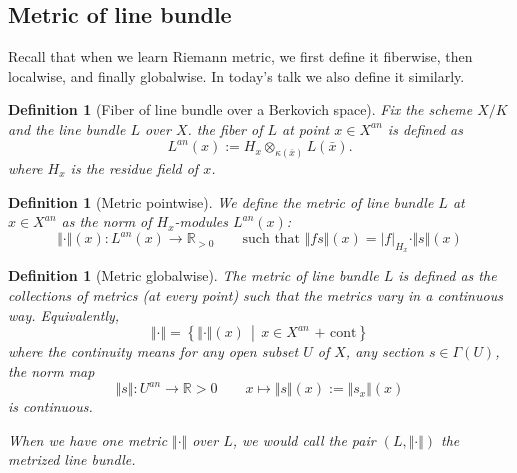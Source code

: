 \documentclass[reqno,11pt]{amsart}
\numberwithin{equation}{section}
\theoremstyle{plain}
\newtheorem{defn}[theorem]{Definition}
\theoremstyle{plain}
\numberwithin{equation}{section}
\theoremstyle{remark}
\newcommand{\norm}[1]{\Vert{#1}\Vert}
\begin{document}
\subsection{Metric of line bundle}
Recall that when we learn Riemann metric, we first define it fiberwise, then localwise, and finally globalwise. In today's talk we also define it similarly.

\begin{defn}[Fiber of line bundle over a Berkovich space]
Fix the scheme $X/K$ and the line bundle $L$ over $X$. the fiber of $L$ at point $x \in X^{an}$ is defined as
$$L^{an}(x):= H_x \otimes_{\kappa(\bar{x}) }L(\bar{x}).$$
where $H_x$ is the residue field of $x$.
\end{defn}
\begin{center}

\end{center}
\begin{defn}[Metric pointwise]
We define the metric of line bundle $L$ at $x \in X^{an}$ as the norm of $H_x$-modules $L^{an}(x)$:
$$\norm{\cdot}(x):L^{an}(x) \longrightarrow \mathbb{R}_{>0} \qquad \text{such that }\norm{fs}(x)=|f|_{H_x} \cdot\norm{s}(x) $$
\end{defn}
\begin{defn}[Metric globalwise]
The metric of line bundle $L$ is defined as the collections of metrics (at every point) such that the metrics vary in a continuous way. Equivalently,
$$\norm{\cdot}=\left\{ \norm{\cdot}(x)\, \middle|\, x\in X^{an} \text{ + cont} \right\}$$
where the continuity means for any open subset $U$ of $X$, any section $s \in \Gamma(U)$, the norm map
$$\norm{s}: U^{an} \longrightarrow \mathbb{R}>0 \qquad x \longmapsto \norm{s}(x):=\norm{s_x}(x)$$
is continuous.

When we have one metric $\norm{\cdot}$ over $L$, we would call the pair $(L,\norm{\cdot})$ the metrized line bundle.
\end{defn}
\end{document}
